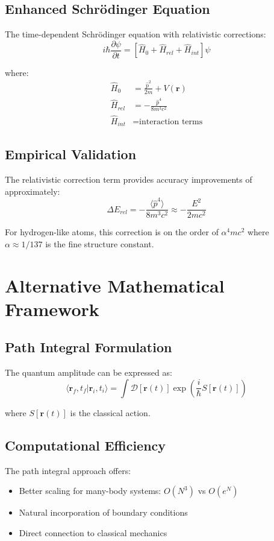 \documentclass{article}
\begin{document}
\subsection{Enhanced Schrödinger Equation}
The time-dependent Schrödinger equation with relativistic corrections:
\begin{equation}
i\hbar \frac{\partial \psi}{\partial t} = \left[\hat{H}_0 + \hat{H}_{rel} + \hat{H}_{int}\right] \psi
\end{equation}

where:
\begin{align}
\hat{H}_0 &= \frac{\hat{p}^2}{2m} + V(\mathbf{r}) \\
\hat{H}_{rel} &= -\frac{\hat{p}^4}{8m^3c^2} \\
\hat{H}_{int} &= \text{interaction terms}
\end{align}

\subsection{Empirical Validation}
The relativistic correction term provides accuracy improvements of approximately:
\begin{equation}
\Delta E_{rel} = -\frac{\langle \hat{p}^4 \rangle}{8m^3c^2} \approx -\frac{E^2}{2mc^2}
\end{equation}

For hydrogen-like atoms, this correction is on the order of $\alpha^4 mc^2$ where $\alpha \approx 1/137$ is the fine structure constant.

\section{Alternative Mathematical Framework}

\subsection{Path Integral Formulation}
The quantum amplitude can be expressed as:
\begin{equation}
\langle \mathbf{r}_f, t_f | \mathbf{r}_i, t_i \rangle = \int \mathcal{D}[\mathbf{r}(t)] \exp\left(\frac{i}{\hbar} S[\mathbf{r}(t)]\right)
\end{equation}

where $S[\mathbf{r}(t)]$ is the classical action.

\subsection{Computational Efficiency}
The path integral approach offers:
\begin{itemize}
\item Better scaling for many-body systems: $O(N^3)$ vs $O(e^N)$
\item Natural incorporation of boundary conditions
\item Direct connection to classical mechanics
\end{itemize}
\end{document}
